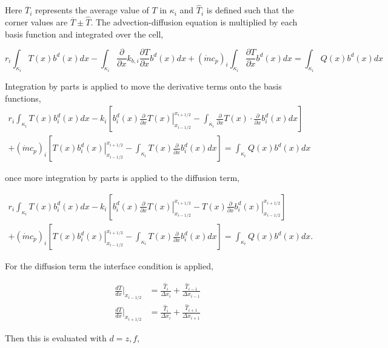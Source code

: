 \documentclass{proposal}
\newcommand{\ddx}{\ensuremath{\frac{\partial}{\partial x}}}
\begin{document}
\begin{appendices}
Here $\overline{T}_i$ represents the average value of $T$ in $\kappa_i$ and $\hat{T}_i$ is defined such that the corner values are $\overline{T} \pm \hat{T}$. The advection-diffusion equation is multiplied by each basis function and integrated over the cell,

\begin{equation}
    r_i \int_{\kappa_i}T(x)b^d(x)dx - \int_{\kappa_i} \ddx k_{b, i} \frac{\partial T}{\partial x}b^d(x)dx + (\dot{m}c_p)_i \int_{\kappa_i} \frac{\partial T}{\partial x}b^d(x)dx = \int_{\kappa_i} Q(x)b^d(x)dx
\end{equation}

Integration by parts is applied to move the derivative terms onto the basis functions,
\begin{multline}
    r_i \int_{\kappa_i}T(x)b_i^d(x)dx - k_{i}\left[\left.b_i^d(x)\ddx T(x) \right|_{x_{i-1/2}}^{x_{i+1/2}} - \int_{\kappa_i}\ddx T(x) \cdot \ddx b_i^d(x)dx  \right] \\
    + (\dot{m}c_p)_i \left[\left. T(x)b_i^d(x) \right|_{x_{i-1/2}}^{x_{i+1/2}} - \int_{\kappa_i}T(x)\ddx b_i^d(x) dx \right] = \int_{\kappa_i} Q(x)b^d(x)dx
\end{multline}

once more integration by parts is applied to the diffusion term,

\begin{multline}
    r_i \int_{\kappa_i}T(x)b_i^d(x)dx - k_{i}\left[\left.b_i^d(x)\ddx T(x) \right|_{x_{i-1/2}}^{x_{i+1/2}} - \left. T(x) \ddx b_i^d(x) \right|_{x_{i-1/2}}^{x_{i+1/2}}  \right] \\
    + (\dot{m}c_p)_i \left[\left. T(x)b_i^d(x) \right|_{x_{i-1/2}}^{x_{i+1/2}} - \int_{\kappa_i}T(x)\ddx b_i^d(x) dx \right] = \int_{\kappa_i} Q(x)b^d(x)dx.
\end{multline}

For the diffusion term the interface condition is applied,

\begin{subequations}
    \begin{align}
        \frac{d T}{dx}\Bigg|_{x_{i-1/2}} &= \frac{\hat{T}_i}{\Delta x_i} + \frac{\hat{T}_{i-1}}{\Delta x_{i-1}}\\
        \frac{d T}{dx}\Bigg|_{x_{i+1/2}} &= \frac{\hat{T}_i}{\Delta x_i} + \frac{\hat{T}_{i+1}}{\Delta x_{i+1}}
    \end{align}
\end{subequations}

Then this is evaluated with $d=z, f$,


\end{appendices}
\end{document}
